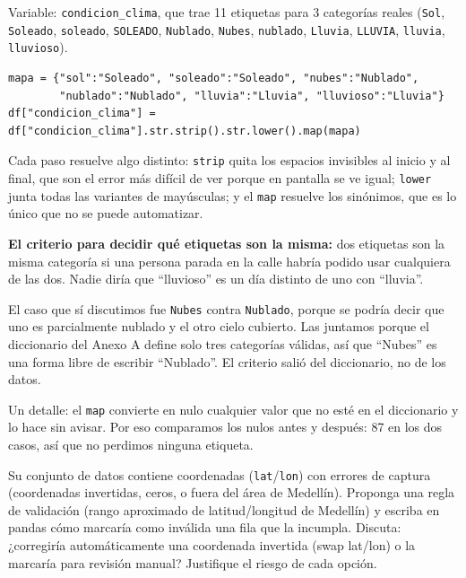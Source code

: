 \documentclass[11pt]{article}
\begin{document}
\begin{respuesta}[Respuesta 2.3]
Variable: \texttt{condicion\_clima}, que trae 11 etiquetas para 3 categorías reales (\texttt{Sol}, \texttt{Soleado}, \texttt{soleado}, \texttt{SOLEADO}, \texttt{Nublado}, \texttt{Nubes}, \texttt{nublado}, \texttt{Lluvia}, \texttt{LLUVIA}, \texttt{lluvia}, \texttt{lluvioso}).

\begin{verbatim}
mapa = {"sol":"Soleado", "soleado":"Soleado", "nubes":"Nublado",
        "nublado":"Nublado", "lluvia":"Lluvia", "lluvioso":"Lluvia"}
df["condicion_clima"] = df["condicion_clima"].str.strip().str.lower().map(mapa)
\end{verbatim}

Cada paso resuelve algo distinto: \texttt{strip} quita los espacios invisibles al inicio y al final, que son el error más difícil de ver porque en pantalla se ve igual; \texttt{lower} junta todas las variantes de mayúsculas; y el \texttt{map} resuelve los sinónimos, que es lo único que no se puede automatizar.

\medskip
\noindent\textbf{El criterio para decidir qué etiquetas son la misma:} dos etiquetas son la misma categoría si una persona parada en la calle habría podido usar cualquiera de las dos. Nadie diría que ``lluvioso'' es un día distinto de uno con ``lluvia''.

El caso que sí discutimos fue \texttt{Nubes} contra \texttt{Nublado}, porque se podría decir que uno es parcialmente nublado y el otro cielo cubierto. Las juntamos porque el diccionario del Anexo A define solo tres categorías válidas, así que ``Nubes'' es una forma libre de escribir ``Nublado''. El criterio salió del diccionario, no de los datos.

Un detalle: el \texttt{map} convierte en nulo cualquier valor que no esté en el diccionario y lo hace sin avisar. Por eso comparamos los nulos antes y después: 87 en los dos casos, así que no perdimos ninguna etiqueta.
\end{respuesta}


\begin{pregunta}
Su conjunto de datos contiene coordenadas (\texttt{lat}/\texttt{lon}) con errores de captura (coordenadas invertidas, ceros, o fuera del área de Medellín). Proponga una regla de validación (rango aproximado de latitud/longitud de Medellín) y escriba en pandas cómo marcaría como inválida una fila que la incumpla. Discuta: ¿corregiría automáticamente una coordenada invertida (swap lat/lon) o la marcaría para revisión manual? Justifique el riesgo de cada opción.
\end{pregunta}
\end{document}
